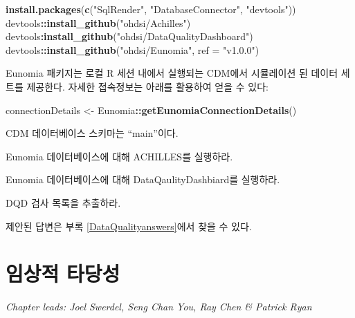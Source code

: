 \documentclass[10.5pt]{book}
\newenvironment{Shaded}{\begin{snugshade}}{\end{snugshade}}
\newcommand{\KeywordTok}[1]{\textcolor[rgb]{0.13,0.29,0.53}{\textbf{#1}}}
\newcommand{\DataTypeTok}[1]{\textcolor[rgb]{0.13,0.29,0.53}{#1}}
\newcommand{\StringTok}[1]{\textcolor[rgb]{0.31,0.60,0.02}{#1}}
\newcommand{\OperatorTok}[1]{\textcolor[rgb]{0.81,0.36,0.00}{\textbf{#1}}}
\newcommand{\NormalTok}[1]{#1}
\theoremstyle{definition}
\theoremstyle{definition}
\theoremstyle{definition}
\theoremstyle{remark}
\let\BeginKnitrBlock\begin \let\EndKnitrBlock\end
\begin{document}
\begin{Shaded}
\begin{Highlighting}[]
\KeywordTok{install.packages}\NormalTok{(}\KeywordTok{c}\NormalTok{(}\StringTok{"SqlRender"}\NormalTok{, }\StringTok{"DatabaseConnector"}\NormalTok{, }\StringTok{"devtools"}\NormalTok{))}
\NormalTok{devtools}\OperatorTok{::}\KeywordTok{install_github}\NormalTok{(}\StringTok{"ohdsi/Achilles"}\NormalTok{)}
\NormalTok{devtools}\OperatorTok{:}\KeywordTok{install_github}\NormalTok{(}\StringTok{"ohdsi/DataQualityDashboard"}\NormalTok{)}
\NormalTok{devtools}\OperatorTok{::}\KeywordTok{install_github}\NormalTok{(}\StringTok{"ohdsi/Eunomia"}\NormalTok{, }\DataTypeTok{ref =} \StringTok{"v1.0.0"}\NormalTok{)}
\end{Highlighting}
\end{Shaded}

Eunomia 패키지는 로컬 R 세션 내에서 실행되는 CDM에서 시뮬레이션 된
데이터 세트를 제공한다. 자세한 접속정보는 아래를 활용하여 얻을 수 있다:

\begin{Shaded}
\begin{Highlighting}[]
\NormalTok{connectionDetails <-}\StringTok{ }\NormalTok{Eunomia}\OperatorTok{::}\KeywordTok{getEunomiaConnectionDetails}\NormalTok{()}
\end{Highlighting}
\end{Shaded}

CDM 데이터베이스 스키마는 ``main''이다.

\BeginKnitrBlock{exercise}
\protect\hypertarget{exr:exerciseRunAchilles}{}{\label{exr:exerciseRunAchilles}
}Eunomia 데이터베이스에 대해 ACHILLES를 실행하라.
\EndKnitrBlock{exercise}

\BeginKnitrBlock{exercise}
\protect\hypertarget{exr:exerciseRunDQD}{}{\label{exr:exerciseRunDQD}
}Eunomia 데이터베이스에 대해 DataQaulityDashbiard를 실행하라.
\EndKnitrBlock{exercise}

\BeginKnitrBlock{exercise}
\protect\hypertarget{exr:exerciseViewDQD}{}{\label{exr:exerciseViewDQD} }DQD
검사 목록을 추출하라.
\EndKnitrBlock{exercise}

제안된 답변은 부록 \ref{DataQualityanswers}에서 찾을 수 있다.

\chapter{임상적 타당성}\label{ClinicalValidity}

\emph{Chapter leads: Joel Swerdel, Seng Chan You, Ray Chen \& Patrick
Ryan}
\end{document}
